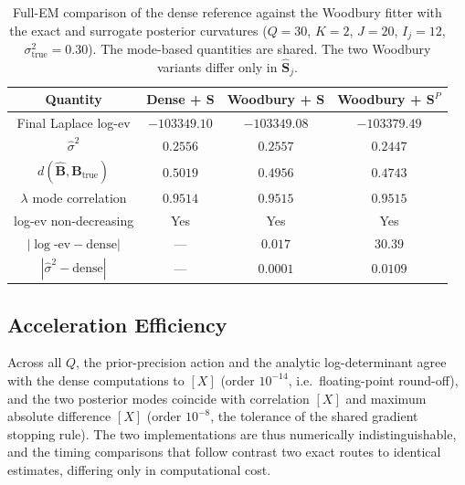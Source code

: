 \begin{table}[H]
\centering
\caption{Full-EM comparison of the dense reference against the Woodbury fitter with the
exact and surrogate posterior curvatures ($Q=30$, $K=2$, $J=20$, $I_j=12$, $\sigma^2_{\text{true}}=0.30$).
The mode-based quantities are shared. The two Woodbury variants differ only in
$\hat{\mathbf{S}}_j$.}
\label{tab:Shat-compare}
\begin{tabular}{@{}cccc@{}}
\toprule
Quantity & Dense + $\mathbf S$ & Woodbury + $\mathbf S$ & Woodbury + $\mathbf S^{P}$ \\
\midrule
Final Laplace log-ev      & $-103349.10$ & $-103349.08$ & $-103379.49$ \\
$\hat{\sigma}^2$            & $0.2556$     & $0.2557$     & $0.2447$ \\
$d(\hat{\mathbf B},\mathbf B_{\text{true}})$ & $0.5019$ & $0.4956$ & $0.4743$ \\
$\lambda$ mode correlation      & $0.9514$     & $0.9515$     & $0.9515$ \\
log-ev non-decreasing     & Yes          & Yes          & Yes \\
\midrule
$|\log\text{-ev} - \text{dense}|$ & --- & $0.017$ & $30.39$ \\
$|\widehat\sigma^2 - \text{dense}|$ & --- & $0.0001$ & $0.0109$ \\
\bottomrule
\end{tabular}
\end{table}

\subsection{Acceleration Efficiency}
\label{sec:acceleration-efficiency}

Across all $Q$, the prior-precision action and the analytic log-determinant agree with the
dense computations to $[X]$ (order $10^{-14}$, i.e.\ floating-point round-off), and the two
posterior modes coincide with correlation $[X]$ and maximum absolute difference $[X]$
(order $10^{-8}$, the tolerance of the shared gradient stopping rule). The two implementations
are thus numerically indistinguishable, and the timing comparisons that follow contrast two
exact routes to identical estimates, differing only in computational cost.

